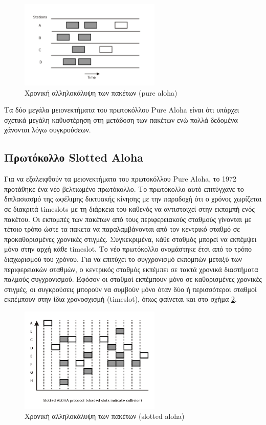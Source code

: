 \documentclass[12pt]{report}
\begin{document}
\begin{figure}[ht]
\centering
\includegraphics[width=0.6\textwidth]{pure_aloha_slots}
\caption{Χρονική αλληλοκάλυψη των πακέτων (\textlatin{pure aloha})}
\label{fig:pure_aloha_slots}
\end{figure}

Τα δύο μεγάλα μειονεκτήματα του πρωτοκόλλου \textlatin{Pure Aloha} είναι ότι υπάρχει σχετικά μεγάλη καθυστέρηση στη μετάδοση των πακέτων ενώ πολλά δεδομένα χάνονται λόγω συγκρούσεων.

\subsection{Πρωτόκολλο \textlatin{Slotted Aloha}}
Για να εξαλειφθούν τα μειονεκτήματα του πρωτοκόλλου \textlatin{Pure Aloha}, το 1972 προτάθηκε ένα νέο βελτιωμένο πρωτόκολλο. Το πρωτόκολλο αυτό επιτύγχανε το διπλασιασμό της ωφέλιμης δικτυακής κίνησης με την παραδοχή ότι ο χρόνος χωρίζεται σε διακριτά \textlatin{timeslots} με τη διάρκεια του καθενός να αντιστοιχεί στην εκπομπή ενός πακέτου. Οι εκπομπές των πακέτων από τους περιφερειακούς σταθμούς γίνονται με τέτοιο τρόπο ώστε τα πακετα να παραλαμβάνονται από τον κεντρικό σταθμό σε προκαθορισμένες χρονικές στιγμές. Συγκεκριμένα, κάθε σταθμός μπορεί να εκπέμψει μόνο στην αρχή κάθε \textlatin{timeslot}. Το νέο πρωτόκολλο ονομάστηκε έτσι από το τρόπο διαχωρισμού του χρόνου. Για να επιτύχει το συγχρονισμό εκπομπών μεταξύ των περιφερειακών σταθμών, ο κεντρικός σταθμός εκπέμπει σε τακτά χρονικά διαστήματα παλμούς συγχρονισμού. Εφόσον οι σταθμοί εκπέμπουν μόνο σε καθορισμένες χρονικές στιγμές, οι συγκρούσεις μπορούν να συμβούν μόνο όταν δύο ή περισσότεροι σταθμοί εκπέμπουν στην ίδια χρονοσχισμή (\textlatin{timeslot}), όπως φαίνεται και στο σχήμα \ref{fig:slotted_aloha_slots}.

\begin{figure}[ht]
\centering
\includegraphics[width=0.6\textwidth]{slotted_aloha_slots}
\caption{Χρονική αλληλοκάλυψη των πακέτων (\textlatin{slotted aloha})}
\label{fig:slotted_aloha_slots}
\end{figure}
\end{document}
